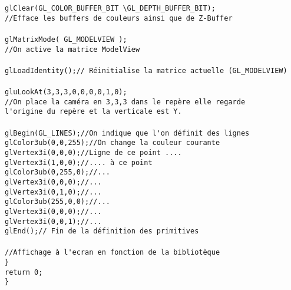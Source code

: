 \begin{tabbing}
\>\> \verb|glClear(GL_COLOR_BUFFER_BIT \GL_DEPTH_BUFFER_BIT);|\\
\>\> \verb|//Efface les buffers de couleurs ainsi que de Z-Buffer|\\
\\
\>\> \verb|glMatrixMode( GL_MODELVIEW );|\\
\>\> \verb|//On active la matrice ModelView|\\
\\
\>\> \verb|glLoadIdentity();// Réinitialise la matrice actuelle (GL_MODELVIEW)|\\
\\
\>\> \verb|gluLookAt(3,3,3,0,0,0,0,1,0);|\\
\>\> \verb|//On place la caméra en 3,3,3 dans le repère elle regarde|\\
\>\> \verb|l'origine du repère et la verticale est Y.|\\
\\
\>\> \verb|glBegin(GL_LINES);//On indique que l'on définit des lignes|\\
\>\>\> \verb|glColor3ub(0,0,255);//On change la couleur courante|\\
\>\>\> \verb|glVertex3i(0,0,0);//Ligne de ce point ....|\\
\>\>\> \verb|glVertex3i(1,0,0);//.... à ce point|\\
\>\>\> \verb|glColor3ub(0,255,0);//...|\\
\>\>\> \verb|glVertex3i(0,0,0);//...|\\
\>\>\> \verb|glVertex3i(0,1,0);//...|\\
\>\>\> \verb|glColor3ub(255,0,0);//...|\\
\>\>\> \verb|glVertex3i(0,0,0);//...|\\
\>\>\> \verb|glVertex3i(0,0,1);//...|\\
\>\> \verb|glEnd();// Fin de la définition des primitives|\\
\\
\>\> \verb|//Affichage à l'ecran en fonction de la bibliotèque|\\

\> \verb|}|\\
\> \verb|return 0;|\\
\verb|}|
\end{tabbing}

